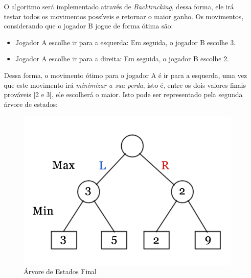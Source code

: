 \documentclass[]{article}
\begin{document}
	O algoritmo será implementado através de \textit{Backtracking}, dessa forma, ele irá testar todos os movimentos possíveis e retornar o maior ganho. Os movimentos, considerando que o jogador B jogue de forma ótima são:
	\begin{itemize}
		\item Jogador A escolhe ir para a esquerda: Em seguida, o jogador B escolhe 3.
		\item Jogador A escolhe ir para a direita: Em seguida, o jogador B escolhe 2.
	\end{itemize}
	Dessa forma, o movimento ótimo para o jogador A é ir para a esquerda, uma vez que este movimento irá \emph{minimizar a sua perda}, isto é, entre os dois valores finais prováveis [2 e 3], ele escolherá o maior. Isto pode ser representado pela segunda árvore de estados:
	\begin{figure}[H]
	   \includegraphics[width=\linewidth]{gtt2.png}
	   \caption{Árvore de Estados Final\cite{gfg}}
	   \label{fig:arvore2}
	\end{figure}
	
	
	
\end{document}
